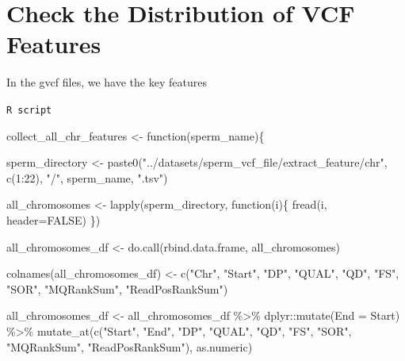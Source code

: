 \documentclass[
  letterpaper,
  DIV=11,
  numbers=noendperiod]{scrreprt}
\newenvironment{Shaded}{\begin{snugshade}}{\end{snugshade}}
\newcommand{\AttributeTok}[1]{\textcolor[rgb]{0.40,0.45,0.13}{#1}}
\newcommand{\ConstantTok}[1]{\textcolor[rgb]{0.56,0.35,0.01}{#1}}
\newcommand{\ControlFlowTok}[1]{\textcolor[rgb]{0.00,0.23,0.31}{#1}}
\newcommand{\DecValTok}[1]{\textcolor[rgb]{0.68,0.00,0.00}{#1}}
\newcommand{\FunctionTok}[1]{\textcolor[rgb]{0.28,0.35,0.67}{#1}}
\newcommand{\NormalTok}[1]{\textcolor[rgb]{0.00,0.23,0.31}{#1}}
\newcommand{\OtherTok}[1]{\textcolor[rgb]{0.00,0.23,0.31}{#1}}
\newcommand{\SpecialCharTok}[1]{\textcolor[rgb]{0.37,0.37,0.37}{#1}}
\newcommand{\StringTok}[1]{\textcolor[rgb]{0.13,0.47,0.30}{#1}}
\begin{document}
\hypertarget{check-the-distribution-of-vcf-features}{%
\section{Check the Distribution of VCF
Features}\label{check-the-distribution-of-vcf-features}}

In the gvcf files, we have the key features

\begin{codelisting}

\caption{\texttt{R script}}

\begin{Shaded}
\begin{Highlighting}[]
\NormalTok{collect\_all\_chr\_features }\OtherTok{\textless{}{-}} \ControlFlowTok{function}\NormalTok{(sperm\_name)\{}
  
\NormalTok{  sperm\_directory }\OtherTok{\textless{}{-}} \FunctionTok{paste0}\NormalTok{(}\StringTok{"../datasets/sperm\_vcf\_file/extract\_feature/chr"}\NormalTok{, }\FunctionTok{c}\NormalTok{(}\DecValTok{1}\SpecialCharTok{:}\DecValTok{22}\NormalTok{), }\StringTok{"/"}\NormalTok{, sperm\_name, }\StringTok{".tsv"}\NormalTok{)}
  
\NormalTok{  all\_chromosomes }\OtherTok{\textless{}{-}} \FunctionTok{lapply}\NormalTok{(sperm\_directory, }\ControlFlowTok{function}\NormalTok{(i)\{}
  \FunctionTok{fread}\NormalTok{(i, }\AttributeTok{header=}\ConstantTok{FALSE}\NormalTok{)}
\NormalTok{  \})}
  
\NormalTok{  all\_chromosomes\_df }\OtherTok{\textless{}{-}} \FunctionTok{do.call}\NormalTok{(rbind.data.frame, all\_chromosomes)}
  
  \FunctionTok{colnames}\NormalTok{(all\_chromosomes\_df) }\OtherTok{\textless{}{-}} \FunctionTok{c}\NormalTok{(}\StringTok{"Chr"}\NormalTok{, }\StringTok{"Start"}\NormalTok{, }\StringTok{"DP"}\NormalTok{, }\StringTok{"QUAL"}\NormalTok{, }\StringTok{"QD"}\NormalTok{, }\StringTok{"FS"}\NormalTok{, }\StringTok{"SOR"}\NormalTok{, }\StringTok{"MQRankSum"}\NormalTok{, }\StringTok{"ReadPosRankSum"}\NormalTok{)}
  
\NormalTok{  all\_chromosomes\_df }\OtherTok{\textless{}{-}}\NormalTok{ all\_chromosomes\_df }\SpecialCharTok{\%\textgreater{}\%}\NormalTok{ dplyr}\SpecialCharTok{::}\FunctionTok{mutate}\NormalTok{(}\AttributeTok{End =}\NormalTok{ Start) }\SpecialCharTok{\%\textgreater{}\%} 
                        \FunctionTok{mutate\_at}\NormalTok{(}\FunctionTok{c}\NormalTok{(}\StringTok{"Start"}\NormalTok{, }\StringTok{"End"}\NormalTok{, }\StringTok{"DP"}\NormalTok{, }\StringTok{"QUAL"}\NormalTok{, }\StringTok{"QD"}\NormalTok{, }\StringTok{"FS"}\NormalTok{, }\StringTok{"SOR"}\NormalTok{, }\StringTok{"MQRankSum"}\NormalTok{, }\StringTok{"ReadPosRankSum"}\NormalTok{), as.numeric)}
  

\end{Highlighting}
\end{Shaded}
\end{codelisting}
\end{document}

